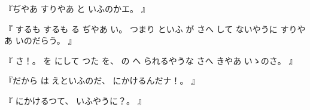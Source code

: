 %
『ぢやあ
すりやあ
と
いふのかエ。
』

%
『
するも
するも
る
ぢやあ
い。
%
つまり
といふ
が
さへ
して
ないやうに
すりやあ
いのだらう。
』

%
『
さ！。
%
を
にして
つた
を、
%
の
へ
られるやうな
さへ
きやあ
いゝのさ。
』

%
『だから
は
えといふのだ、
%
にかけるんだナ！。
』

%
『
にかけるつて、
%
いふやうに？。
』

